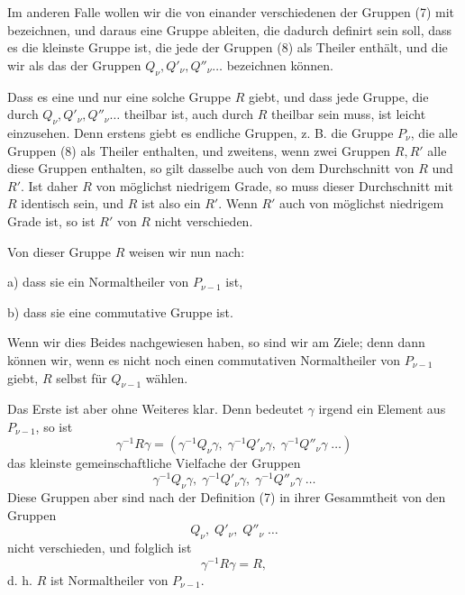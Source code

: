 Im anderen Falle wollen wir die von einander verschiedenen der Gruppen (7) mit
bezeichnen, und daraus eine Gruppe
ableiten, die dadurch definirt sein soll, dass es die kleinste Gruppe ist, die jede der Gruppen (8) als Theiler enthält, und die wir als das  der Gruppen $Q_\nu, Q'_\nu, Q''_\nu \ldots$ bezeichnen können.

Dass es eine und nur eine solche Gruppe $R$ giebt, und dass jede Gruppe, die durch $Q_\nu, Q'_\nu, Q''_\nu \ldots$ theilbar ist, auch durch $R$ theilbar sein muss, ist leicht einzusehen. Denn erstens giebt es endliche Gruppen, z. B. die Gruppe $P_\nu$, die alle Gruppen (8) als Theiler enthalten, und zweitens, wenn zwei Gruppen $R, R'$ alle diese Gruppen enthalten, so gilt dasselbe auch von dem Durchschnitt von $R$ und $R'$. Ist daher $R$ von möglichst niedrigem Grade, so muss dieser Durchschnitt mit $R$ identisch sein, und $R$ ist also ein  $R'$. Wenn $R'$ auch von möglichst niedrigem Grade ist, so ist $R'$ von $R$ nicht verschieden.

Von dieser Gruppe $R$ weisen wir nun nach:

a) dass sie ein Normaltheiler von $P_{\nu-1}$ ist,

b) dass sie eine commutative Gruppe ist.

Wenn wir dies Beides nachgewiesen haben, so sind wir am Ziele; denn dann können wir, wenn es nicht noch einen commutativen Normaltheiler  von $P_{\nu-1}$ giebt, $R$ selbst für $Q_{\nu-1}$ wählen.

Das Erste ist aber ohne Weiteres klar. Denn bedeutet $\gamma$ irgend ein Element aus $P_{\nu-1}$, so ist
\[ \gamma^{-1} R \gamma = (\gamma^{-1} Q_\nu \gamma, \; \gamma^{-1} Q'_\nu \gamma, \; \gamma^{-1} Q''_\nu \gamma \; \ldots) \]
das kleinste gemeinschaftliche Vielfache der Gruppen
\[ \gamma^{-1} Q_\nu \gamma, \; \gamma^{-1} Q'_\nu \gamma, \; \gamma^{-1} Q''_\nu \gamma \; \ldots \]
Diese Gruppen aber sind nach der Definition (7) in ihrer Gesammtheit von den Gruppen
\[ Q_\nu, \; Q'_\nu, \; Q''_\nu \; \ldots \]
nicht verschieden, und folglich ist
\[ \gamma^{-1} R \gamma = R, \]
d. h. $R$ ist Normaltheiler von $P_{\nu-1}$.
